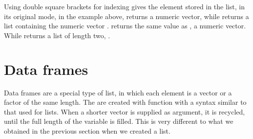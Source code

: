 \documentclass[paper=a4,headsepline,BCOR=12mm,twoside,open=right,%
titlepage,headings=small,fontsize=10pt,index=totoc,bibliography=totoc,%
captions=tableheading,captions=nooneline]{scrbook}\usepackage{knitr}
\begin{document}
Using double square brackets for indexing gives the element stored in the list, in its original mode, in the example above,  returns a numeric vector, while  returns a list containing the numeric vector .  returns the same value as , a numeric vector. While  returns a list of length two, .

\section{Data frames}

Data frames are a special type of list, in which each element is a vector or a factor of the same length. The are created with function  with a syntax similar to that used for lists. When a shorter vector is supplied as argument, it is recycled, until the full length of the variable is filled. This is very different to what we obtained in the previous section when we created a list.
\end{document}
